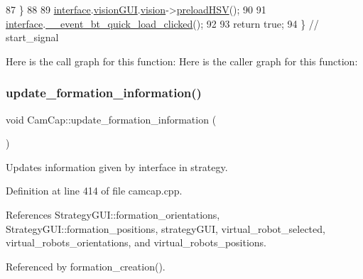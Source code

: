 \begin{DoxyCode}
87     \}
88 
89     \hyperlink{class_cam_cap_a58002893dfb61307042ddbba0c362dcd}{interface}.\hyperlink{class_v_s_s_s___g_u_i_1_1_v4_l_interface_a7a2432ad62a960423bc3370abe5c8930}{visionGUI}.\hyperlink{class_vision_g_u_i_a36aba058af844ec6cbe0c945c616cd5f}{vision}->\hyperlink{class_vision_ac0c3f793197c5fec6dddb22ff7c7383c}{preloadHSV}();
90 
91     \hyperlink{class_cam_cap_a58002893dfb61307042ddbba0c362dcd}{interface}.\hyperlink{class_v_s_s_s___g_u_i_1_1_v4_l_interface_a3010084dff2d7f93eed40efaab8ee61b}{\_\_event\_bt\_quick\_load\_clicked}();
92 
93     \textcolor{keywordflow}{return} \textcolor{keyword}{true};
94 \} \textcolor{comment}{// start\_signal}
\end{DoxyCode}
Here is the call graph for this function\+:
Here is the caller graph for this function\+:
\mbox{\label{class_cam_cap_afa26f0cbaee5db899735934f3548ebe9}} 
\subsubsection{\texorpdfstring{update\+\_\+formation\+\_\+information()}{update\_formation\_information()}}
{\footnotesize\ttfamily void Cam\+Cap\+::update\+\_\+formation\+\_\+information (\begin{DoxyParamCaption}{ }\end{DoxyParamCaption})}



Updates information given by interface in strategy. 



Definition at line 414 of file camcap.\+cpp.



References Strategy\+G\+U\+I\+::formation\+\_\+orientations, Strategy\+G\+U\+I\+::formation\+\_\+positions, strategy\+G\+UI, virtual\+\_\+robot\+\_\+selected, virtual\+\_\+robots\+\_\+orientations, and virtual\+\_\+robots\+\_\+positions.



Referenced by formation\+\_\+creation().


